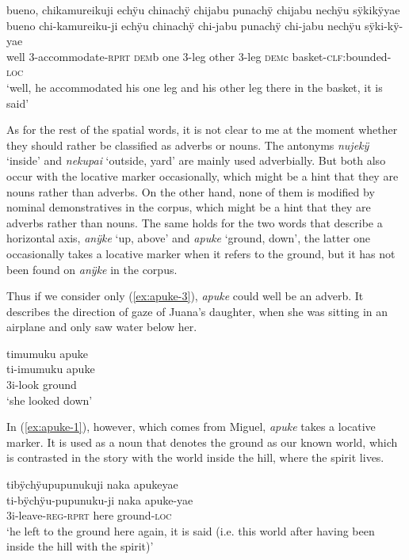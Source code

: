 \ea\label{ex:nechÿu-2}
\begingl
\glpreamble bueno, chikamureikuji echÿu chinachÿ chijabu punachÿ chijabu nechÿu sÿkikÿyae\\
\gla bueno chi-kamureiku-ji echÿu chinachÿ chi-jabu punachÿ chi-jabu nechÿu sÿki-kÿ-yae\\
\glb well 3-accommodate-\textsc{rprt} \textsc{dem}b one 3-leg other 3-leg \textsc{dem}c basket-\textsc{clf}:bounded-\textsc{loc}\\
\glft ‘well, he accommodated his one leg and his other leg there in the basket, it is said’
\endgl
\trailingcitation{[mox-n110920l.110]}
\xe
{}


As for the rest of the spatial words, it is not clear to me at the moment whether they should rather be classified as adverbs or nouns. The antonyms \textit{nujekÿ} ‘inside’ and \textit{nekupai} ‘outside, yard’ are mainly used adverbially. But both also occur with the locative marker occasionally, which might be a hint that they are nouns rather than adverbs. On the other hand, none of them is modified by nominal demonstratives in the corpus, which might be a hint that they are adverbs rather than nouns. The same holds for the two words that describe a horizontal axis, \textit{anÿke} ‘up, above’ and \textit{apuke} ‘ground, down’, the latter one occasionally takes a locative marker when it refers to the ground, but it has not been found on \textit{anÿke} in the corpus.

Thus if we consider only (\ref{ex:apuke-3}), \textit{apuke} could well be an adverb. It describes the direction of gaze of Juana’s daughter, when she was sitting in an airplane and only saw water below her.

\ea\label{ex:apuke-3}
\begingl
\glpreamble timumuku apuke\\
\gla ti-imumuku apuke\\
\glb 3i-look ground\\
\glft ‘she looked down’
\endgl
\trailingcitation{[jxx-p110923l-1.412]}
\xe

In (\ref{ex:apuke-1}), however, which comes from Miguel, \textit{apuke} takes a locative marker. It is used as a noun that denotes the ground as our known world, which is contrasted in the story with the world inside the hill, where the spirit lives.

\ea\label{ex:apuke-1}
\begingl
\glpreamble tibÿchÿupupunukuji naka apukeyae\\
\gla ti-bÿchÿu-pupunuku-ji naka apuke-yae\\
\glb 3i-leave-\textsc{reg}-\textsc{rprt} here ground-\textsc{loc}\\
\glft ‘he left to the ground here again, it is said (i.e. this world after having been inside the hill with the spirit)’
\endgl
\trailingcitation{[mxx-n151017l-1.58]}
\xe

